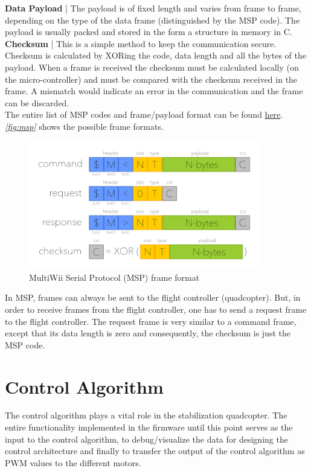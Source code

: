 \documentclass[a4paper,12pt,oneside]{book}
\begin{document}
\textbf{Data Payload} | The payload is of fixed length and varies from frame to frame, depending on the type of the data frame (distinguished by the MSP code). The payload is usually packed and stored in the form a structure in memory in C.\\

\textbf{Checksum} | This is a simple method to keep the communication secure. Checksum is calculated by XORing the code, data length and all the bytes of the payload. When a frame is received the checksum must be calculated locally (on the micro-controller) and must be compared with the checksum received in the frame. A mismatch would indicate an error in the communication and the frame can be discarded.\\

The entire list of MSP codes and frame/payload format can be found \href{http://www.multiwii.com/wiki/index.php?title=Multiwii_Serial_Protocol}{here}. \textit{\autoref{fig:msp}} shows the possible frame formats.\\

\begin{figure}[!htb]
\centering
\includegraphics[width=0.9\textwidth]{images/msp_frame}
\caption{MultiWii Serial Protocol (MSP) frame format}
\label{fig:msp}
\end{figure}

In MSP, frames can always be sent to the flight controller (quadcopter). But, in order to receive frames from the flight controller, one has to send a request frame to the flight controller. The request frame is very similar to a command frame, except that its data length is zero and consequently, the checksum is just the MSP code.\\

\section{Control Algorithm}
The control algorithm plays a vital role in the stabilization quadcopter. The entire functionality implemented in the firmware until this point serves as the input to the control algorithm, to debug/visualize the data for designing the control architecture and finally to transfer the output of the control algorithm as PWM values to the different motors.\\
\end{document}
